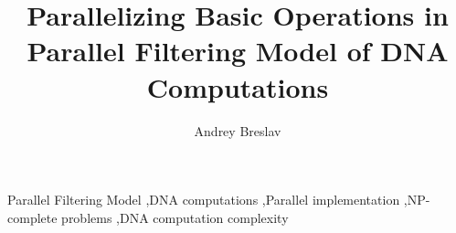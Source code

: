 \documentclass{elsart}
\begin{document}
\begin{frontmatter}

\title{Parallelizing Basic Operations in Parallel Filtering Model of DNA Computations}

\author{Andrey Breslav}
\address{Department of Higher Methemtics, St. Petersburg State University of Information Technology, Mechanics and Optics, 49, Kronverskiy pr, St. Petersburg, 197101, Russia}

\begin{abstract}

\end{abstract}

\begin{keyword}
Parallel Filtering Model \sep DNA computations \sep Parallel implementation \sep NP-complete problems \sep DNA computation complexity
\end{keyword}
\end{frontmatter}

\thispagestyle{empty}

\pagestyle{plain}
\setcounter{page}{1}











\end{document}

